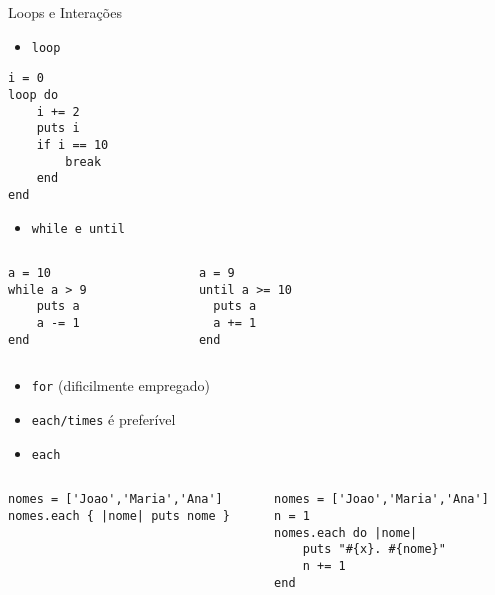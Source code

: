 
\begin{frame}{Loops e Interações}
  \begin{itemize}
	\item \verb!loop!
  \end{itemize}
	\begin{lstlisting}[style=RubyInputStyle, caption=loop.rb]
i = 0
loop do
	i += 2
	puts i 
	if i == 10
		break
	end
end 
	\end{lstlisting}  

\framebreak
  \begin{itemize}
	\item \verb!while e until!
  \end{itemize}
     
  \begin{columns}
    \begin{column}{0.5\textwidth}
      \begin{lstlisting}[style=RubyInputStyle, caption=while.rb]
a = 10
while a > 9
	puts a 
	a -= 1 
end 
      \end{lstlisting}  
    \end{column}
    \begin{column}{0.5\textwidth}  %
      \begin{lstlisting}[style=RubyInputStyle, caption=until.rb]
a = 9
until a >= 10 
  puts a                       
  a += 1                       
end 
      \end{lstlisting}
    \end{column}
  \end{columns}

\framebreak
  \begin{itemize}
		\item \verb!for! (\alert{dificilmente empregado})
    \item \verb!each/times! é preferível
  \end{itemize}
  
  

\framebreak
  \begin{itemize}
	\item \verb!each!
  \end{itemize}
     
  \begin{columns}
    \begin{column}{0.5\textwidth}
      \begin{lstlisting}[style=RubyInputStyle, caption=each\_1.rb]
nomes = ['Joao','Maria','Ana']
nomes.each { |nome| puts nome }
      \end{lstlisting}  
    \end{column}
    \begin{column}{0.5\textwidth} 
      \begin{lstlisting}[style=RubyInputStyle, caption=each\_2.rb]
nomes = ['Joao','Maria','Ana']
n = 1 
nomes.each do |nome|
	puts "#{x}. #{nome}"
	n += 1
end
      \end{lstlisting}
    \end{column}
  \end{columns}
\end{frame}

